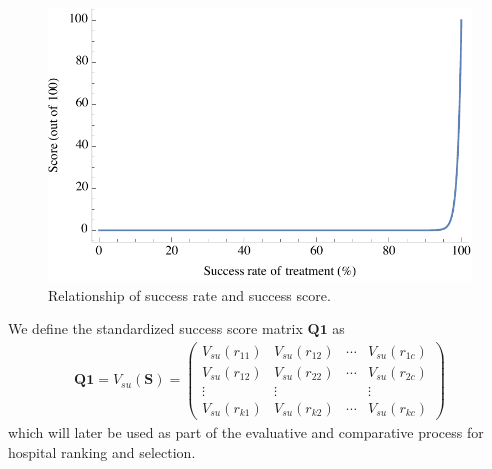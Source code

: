 \documentclass{article}
\begin{document}
\begin{figure}[htbp]
    \centering
    \includegraphics[scale=0.78]{success_rate.pdf}
    \caption{Relationship of success rate and success score.}
    \label{fig:success_rate}
\end{figure}

We define the standardized success score matrix $\mathbf{Q1}$ as
\begin{gather}
    \mathbf{Q1} = V_{su}\left(\mathbf{S}\right) = 
    \begin{pmatrix}
    V_{su}\left(r_{11}\right) & V_{su}\left(r_{12}\right) & \cdots & V_{su}\left(r_{1c}\right)\\
    V_{su}\left(r_{12}\right) & V_{su}\left(r_{22}\right) & \cdots & V_{su}\left(r_{2c}\right)\\
    \vdots & \vdots & & \vdots\\
    V_{su}\left(r_{k1}\right) & V_{su}\left(r_{k2}\right) & \cdots & V_{su}\left(r_{kc}\right)
    \end{pmatrix}
\end{gather}
which will later be used as part of the evaluative and comparative process for hospital ranking and selection.
\end{document}
